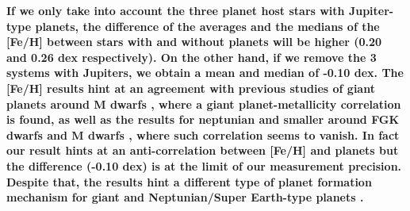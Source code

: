 \documentclass[structabstract]{aa}
\begin{document}
\begin{table}[h]
\centering
\caption{Difference of averages and medians between planet host and non-planet host distributions.}
\label{planets}
\begin{center}
\end{center}
\end{table}

\textbf{If we only take into account the three planet host stars with Jupiter-type planets, the difference of the averages and the medians of the [Fe/H] between stars with and without planets will be higher (0.20 and 0.26 dex respectively). On the other hand, if we remove the 3 systems with Jupiters, we obtain a mean and median of -0.10 dex. \textbf{The [Fe/H] results hint at an agreement with previous studies of giant planets around M dwarfs \citep[e.g.][]{Bonfils-2007,Johnson-2009,Johnson-2010,Schlaufman-2010,Rojas-Ayala-2010,Rojas-Ayala-2012,Terrien-2012}, where a giant planet-metallicity correlation is found, as well as the results for neptunian and smaller around FGK dwarfs \citep[e.g.][]{Sousa-2008,Bouchy-2009,Sousa-2011b, Mayor-2011} and M dwarfs \citep[e.g.][]{Rojas-Ayala-2012,Terrien-2012}}, where such correlation seems to vanish. In fact our result hints at an anti-correlation between [Fe/H] and planets but the difference (-0.10 dex) is at the limit of our measurement precision. Despite that, the results hint a different type of planet formation \textbf{mechanism} for giant and Neptunian/Super Earth-type planets \citep[e.g.][more?]{Mordasini-2012}.}
\end{document}
